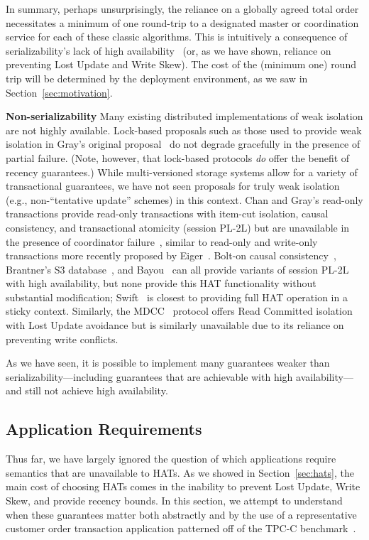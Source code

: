 In summary, perhaps unsurprisingly, the reliance on a globally agreed
total order necessitates a minimum of one round-trip to a designated
master or coordination service for each of these classic algorithms.
This is intuitively a consequence of serializability's lack of high
availability~\cite{davidson-survey} (or, as we have shown, reliance on
preventing Lost Update and Write Skew).  The cost of the (minimum one)
round trip will be determined by the deployment environment, as we saw
in Section~\ref{sec:motivation}.

\vspace{.5em}\noindent\textbf{Non-serializability} Many existing
distributed implementations of weak isolation are not highly
available. Lock-based proposals such as those used to provide weak
isolation in Gray's original proposal~\cite{gray-isolation} do not
degrade gracefully in the presence of partial failure. (Note, however,
that lock-based protocols \textit{do} offer the benefit of recency
guarantees.) While multi-versioned storage systems allow for a variety
of transactional guarantees, we have not seen proposals for truly weak
isolation (e.g., non-``tentative update'' schemes) in this
context. Chan and Gray's read-only transactions provide read-only
transactions with item-cut isolation, causal consistency, and
transactional atomicity (session PL-2L) but are unavailable in the
presence of coordinator failure~\cite{readonly}, similar to read-only
and write-only transactions more recently proposed by
Eiger~\cite{eiger}.  Bolt-on causal consistency~\cite{bolton},
Brantner's S3 database~\cite{kraska-s3}, and
Bayou~\cite{sessionguarantees} can all provide variants of session
PL-2L with high availability, but none provide this HAT functionality
without substantial modification; Swift~\cite{swift} is closest to
providing full HAT operation in a sticky context. Similarly, the
MDCC~\cite{mdcc} protocol offers Read Committed isolation with Lost
Update avoidance but is similarly unavailable due to its reliance on
preventing write conflicts.

As we have seen, it is possible to implement many guarantees weaker
than serializability---including guarantees that are achievable with
high availability---and still not achieve high availability.

\subsection{Application Requirements}

Thus far, we have largely ignored the question of which applications
require semantics that are unavailable to HATs. As we showed in
Section~\ref{sec:hats}, the main cost of choosing HATs comes in the
inability to prevent Lost Update, Write Skew, and provide recency
bounds. In this section, we attempt to understand when these
guarantees matter both abstractly and by the use of a representative
customer order transaction application patterned off of the TPC-C
benchmark~\cite{tpcc}.

